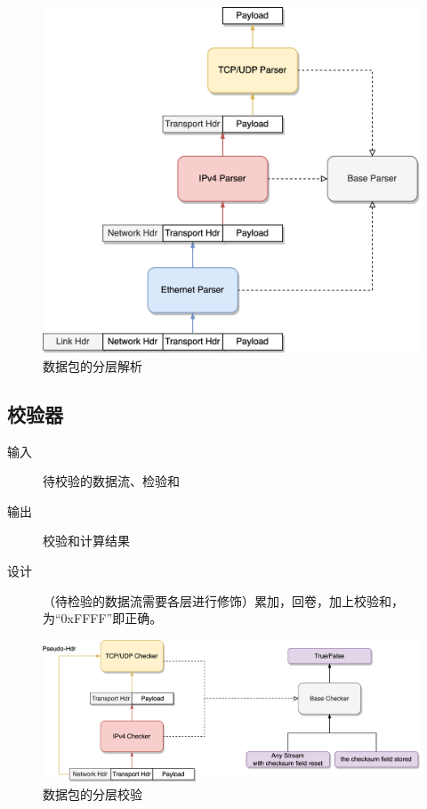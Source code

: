\documentclass[a4paper,11pt]{article}
\begin{document}
\begin{spacing}{1.2}
\begin{CJK}{UTF8}{gbsn}
\begin{figure}[h]
    \centering
    \includegraphics[scale=0.6]{i-par.png}
    \caption{数据包的分层解析}
\end{figure}

\subsection{校验器}

\begin{description}
	\item [输入] 待校验的数据流、检验和
	\item [输出] 校验和计算结果
	\item [设计] （待检验的数据流需要各层进行修饰）累加，回卷，加上校验和，为“0xFFFF”即正确。
\end{description}

\begin{figure}[h]
    \centering
    \includegraphics[scale=0.6]{i-check.png}
    \caption{数据包的分层校验}
\end{figure}






\end{CJK}
\end{spacing}
\end{document}
